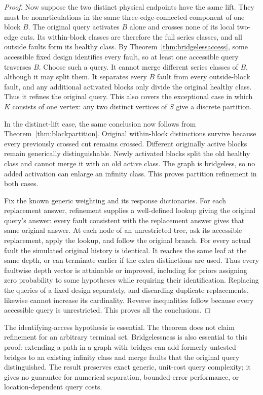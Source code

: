 \documentclass[11pt,letterpaper]{article}
\begin{document}
\begin{proof}
Now suppose the two distinct physical endpoints have the same lift. They must be nonarticulations in the same three-edge-connected component of one block $B$. The original query activates $B$ alone and crosses none of its local two-edge cuts. Its within-block classes are therefore the full series classes, and all outside faults form its healthy class. By Theorem~\ref{thm:bridgelessaccess}, some accessible fixed design identifies every fault, so at least one accessible query traverses $B$. Choose such a query. It cannot merge different series classes of $B$, although it may split them. It separates every $B$ fault from every outside-block fault, and any additional activated blocks only divide the original healthy class. Thus it refines the original query. This also covers the exceptional case in which $K$ consists of one vertex: any two distinct vertices of $S$ give a discrete partition.

In the distinct-lift case, the same conclusion now follows from Theorem~\ref{thm:blockpartition}. Original within-block distinctions survive because every previously crossed cut remains crossed. Different originally active blocks remain generically distinguishable. Newly activated blocks split the old healthy class and cannot merge it with an old active class. The graph is bridgeless, so no added activation can enlarge an infinity class. This proves partition refinement in both cases.

Fix the known generic weighting and its response dictionaries. For each replacement answer, refinement supplies a well-defined lookup giving the original query's answer: every fault consistent with the replacement answer gives that same original answer. At each node of an unrestricted tree, ask its accessible replacement, apply the lookup, and follow the original branch. For every actual fault the simulated original history is identical. It reaches the same leaf at the same depth, or can terminate earlier if the extra distinctions are used. Thus every faultwise depth vector is attainable or improved, including for priors assigning zero probability to some hypotheses while requiring their identification. Replacing the queries of a fixed design separately, and discarding duplicate replacements, likewise cannot increase its cardinality. Reverse inequalities follow because every accessible query is unrestricted. This proves all the conclusions.
\end{proof}

The identifying-access hypothesis is essential. The theorem does not claim refinement for an arbitrary terminal set. Bridgelessness is also essential to this proof: extending a path in a graph with bridges can add formerly untested bridges to an existing infinity class and merge faults that the original query distinguished. The result preserves exact generic, unit-cost query complexity; it gives no guarantee for numerical separation, bounded-error performance, or location-dependent query costs.
\end{document}
